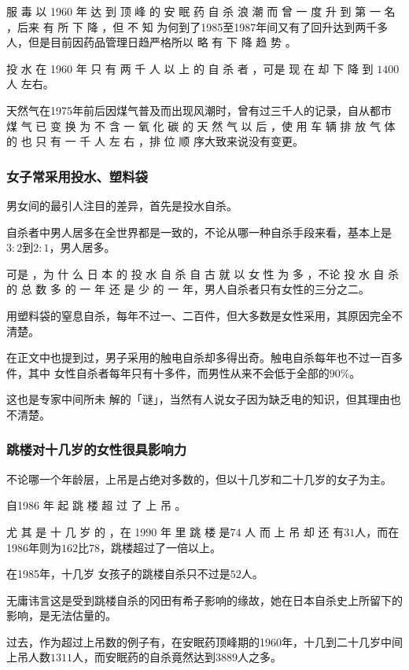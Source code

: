 \documentclass[UTF8]{ctexart}
\begin{document}
服 毒 以 1960 年 达 到 顶 峰 的 安 眠 药 自 杀 浪 潮 而 曾 一 度 升 到 第 一 名 ，后来 有 所 下 降 ，但 不 知 为何到了1985至1987年间又有了回升达到两千多人，但是目前因药品管理日趋严格所以 略 有 下 降 趋 势 。

投 水 在 1960 年 只 有 两 千 人 以 上 的 自 杀 者 ，可是 现 在 却 下 降 到 $1400$ 人 左右。

天然气在1975年前后因煤气普及而出现风潮时，曾有过三千人的记录，自从都市 煤 气 已 变 换 为 不 含 一 氧 化 碳 的 天 然 气 以 后 ，使 用 车 辆 排 放 气 体 的 也 只 有 一 千 人 左 右 ，排 位 顺 序大致来说没有变更。

\subsubsection*{女子常采用投水、塑料袋}

男女间的最引人注目的差异，首先是投水自杀。

自杀者中男人居多在全世界都是一致的，不论从哪一种自杀手段来看，基本上是$3:2$到$2:1$，男人居多。

可是 ，为 什 么 日 本 的 投 水 自 杀 自 古 就 以 女 性 为 多 ，不论 投 水 自 杀 的 总 数 多 的 一 年 还 是 少 的 一 年，男人自杀者只有女性的三分之二。

用塑料袋的窒息自杀，每年不过一、二百件，但大多数是女性采用，其原因完全不清楚。

在正文中也提到过，男子采用的触电自杀却多得出奇。触电自杀每年也不过一百多件，其中 女性自杀者每年只有十多件，而男性从来不会低于全部的$90\%$。

这也是专家中间所未 解的「谜」，当然有人说女子因为缺乏电的知识，但其理由也不清楚。

\subsubsection*{跳楼对十几岁的女性很具影响力}

不论哪一个年龄层，上吊是占绝对多数的，但以十几岁和二十几岁的女子为主。

自1986 年 起 跳 楼 超 过 了 上 吊 。

尤 其 是 十 几 岁 的 ，在 1990 年 里 跳 楼 是$74$ 人 而 上 吊 却 还 有$31$人，而在1986年则为$162$比$78$，跳楼超过了一倍以上。

在1985年，十几岁 女孩子的跳楼自杀只不过是$52$人。

无庸讳言这是受到跳楼自杀的冈田有希子影响的缘故，她在日本自杀史上所留下的影响，是无法估量的。

过去，作为超过上吊数的例子有，在安眠药顶峰期的1960年，十几到二十几岁中间上吊人数$1311$人，而安眠药的自杀竟然达到$3889$人之多。
\end{document}
